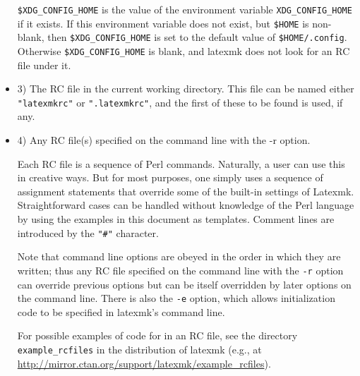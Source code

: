 \begin{itemize}
\verb|$XDG_CONFIG_HOME|  is  the  value  of  the environment variable
\verb|XDG_CONFIG_HOME| if it exists.  If this environment variable
does  not  exist, but  \verb|$HOME|  is  non-blank,  then
\verb|$XDG_CONFIG_HOME| is set to the default value of \verb|$HOME/.config|.
Otherwise \verb|$XDG_CONFIG_HOME| is blank,  and  latexmk does not
look for an RC file under it.

\item 3)  The  RC  file  in  the current working directory.  This file can be
named either \verb|"latexmkrc"| or \verb|".latexmkrc"|, and the first of these to  be
found is used, if any.

\item 4) Any RC file(s) specified on the command line with the -r option.

Each RC file is a sequence of Perl commands.  Naturally, a user can use this in
creative ways.  But for most purposes, one simply  uses  a
sequence of assignment statements that override some of the
built-in settings of Latexmk.  Straightforward cases can be
handled without  knowledge  of  the  Perl  language by using
the examples in this document as templates.  Comment lines are
introduced by the \verb|"#"| character.

Note that command line options are obeyed in the order  in  which  they are
written; thus any RC file specified on the command line with the \verb|-r|
option can override previous options but can be  itself overridden  by later
options on the command line.  There is also the \verb|-e| option, which allows
initialization code to be specified in latexmk's command line.

For possible examples of code for in an RC file, see the directory
\verb|example_rcfiles|  in  the  distribution  of  latexmk (e.g., at
\url{http://mirror.ctan.org/support/latexmk/example_rcfiles}).
\end{itemize}

